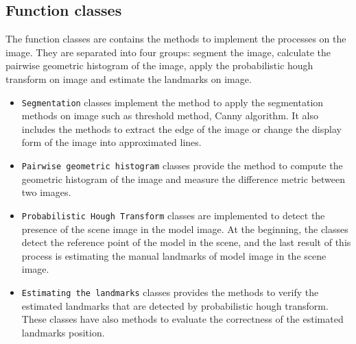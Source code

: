 \subsection{Function classes}
The function classes are contains the methods to implement the processes on the image. They are separated into four groups: segment the image, calculate the pairwise geometric histogram of the image, apply the probabilistic hough transform on image and estimate the landmarks on image.
\begin{itemize}
	\item \texttt{Segmentation} classes implement the method to apply the segmentation methods on image such as threshold method, Canny algorithm. It also includes the methods to extract the edge of the image or change the display form of the image into approximated lines.
	\item \texttt{Pairwise geometric histogram} classes provide the method to compute the geometric histogram of the image and measure the difference metric between two images.
	\item \texttt{Probabilistic Hough Transform} classes are implemented to detect the presence of the scene image in the model image. At the beginning, the classes detect the reference point of the model in the scene, and the last result of this process is estimating the manual landmarks of model image in the scene image.
	\item \texttt{Estimating the landmarks} classes provides the methods to verify the estimated landmarks that are detected by probabilistic hough transform. These classes have also methods to evaluate the correctness of the estimated landmarks position.
\end{itemize}